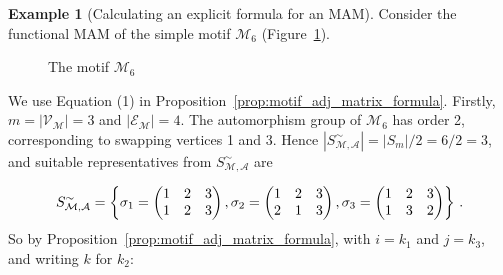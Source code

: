 \documentclass[12pt,draft]{ociamthesis}
\theoremstyle{plain}
\theoremstyle{definition}
\newtheorem{example}{Example}[chapter]
\theoremstyle{remark}
\newcommand\ca[1]{\mathcal{#1}}
\begin{document}
\begin{example}[Calculating an explicit formula for an MAM]
  \label{ex:motif_adj_calc}
  Consider the functional MAM of the simple motif $\ca{M}_6$
  (Figure~\ref{fig:M6}).
  \begin{figure}[H]
    \centering
    \caption{The motif $\ca{M}_6$}
    \label{fig:M6}
  \end{figure}
  We use Equation (1) in Proposition~\ref{prop:motif_adj_matrix_formula}.
  Firstly, $m = |\ca{V_M}| = 3$ and $|\ca{E_M}| = 4$. The automorphism group of
  $\ca{M}_6$ has order 2, corresponding to swapping vertices 1 and 3. Hence
  $|S_\ca{M,A}^\sim| = |S_m| / 2 = 6/2 = 3$, and suitable representatives from
  $S_\ca{M,A}^\sim$ are

  $$ S_\ca{M,A}^\sim = \left\{
    \sigma_1 =
    \begin{pmatrix}
      1 & 2 & 3 \\
      1 & 2 & 3
    \end{pmatrix},
    \sigma_2 =
    \begin{pmatrix}
      1 & 2 & 3 \\
      2 & 1 & 3
    \end{pmatrix},
    \sigma_3 =
    \begin{pmatrix}
      1 & 2 & 3 \\
      1 & 3 & 2
    \end{pmatrix}
  \right\}\,. \vspace*{0.2cm}$$
  So by Proposition~\ref{prop:motif_adj_matrix_formula}, with $i=k_1$ and
  $j=k_3$, and writing $k$ for $k_2$:


\end{example}
\end{document}

